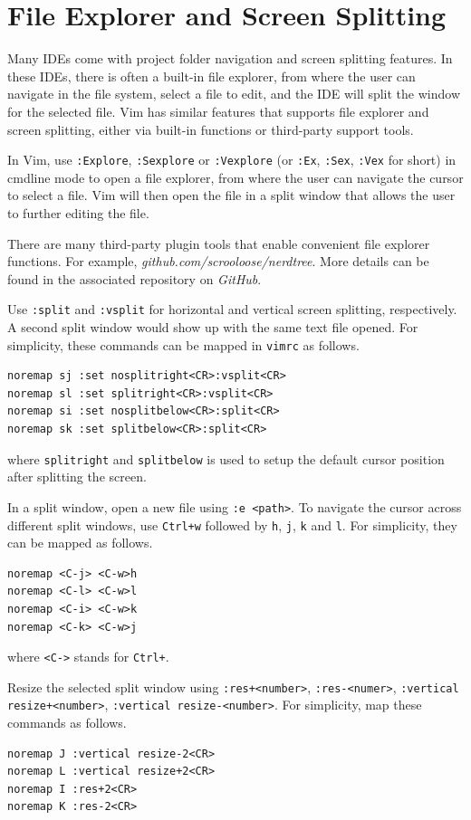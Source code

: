 \section{File Explorer and Screen Splitting}

Many IDEs come with project folder navigation and screen splitting features. In these IDEs, there is often a built-in file explorer, from where the user can navigate in the file system, select a file to edit, and the IDE will split the window for the selected file. Vim has similar features that supports file explorer and screen splitting, either via built-in functions or third-party support tools.

In Vim, use \verb|:Explore|, \verb|:Sexplore| or \verb|:Vexplore| (or \verb|:Ex|, \verb|:Sex|, \verb|:Vex| for short) in cmdline mode to open a file explorer, from where the user can navigate the cursor to select a file. Vim will then open the file in a split window that allows the user to further editing the file.

There are many third-party plugin tools that enable convenient file explorer functions. For example, \textit{github.com/scrooloose/nerdtree}. More details can be found in the associated repository on \textit{GitHub}.

Use \verb|:split| and \verb|:vsplit| for horizontal and vertical screen splitting, respectively. A second split window would show up with the same text file opened. For simplicity, these commands can be mapped in \verb|vimrc| as follows.
\begin{lstlisting}
noremap sj :set nosplitright<CR>:vsplit<CR>
noremap sl :set splitright<CR>:vsplit<CR>
noremap si :set nosplitbelow<CR>:split<CR>
noremap sk :set splitbelow<CR>:split<CR>
\end{lstlisting}
where \verb|splitright| and \verb|splitbelow| is used to setup the default cursor position after splitting the screen.

In a split window, open a new file using \verb|:e <path>|. To navigate the cursor across different split windows, use \verb|Ctrl+w| followed by \verb|h|, \verb|j|, \verb|k| and \verb|l|. For simplicity, they can be mapped as follows.
\begin{lstlisting}
noremap <C-j> <C-w>h
noremap <C-l> <C-w>l
noremap <C-i> <C-w>k
noremap <C-k> <C-w>j
\end{lstlisting}
where \verb|<C->| stands for \verb|Ctrl+|.

Resize the selected split window using \verb|:res+<number>|, \verb|:res-<numer>|, \verb|:vertical resize+<number>|, \verb|:vertical resize-<number>|. For simplicity, map these commands as follows.
\begin{lstlisting}
noremap J :vertical resize-2<CR>
noremap L :vertical resize+2<CR>
noremap I :res+2<CR>
noremap K :res-2<CR>
\end{lstlisting}

